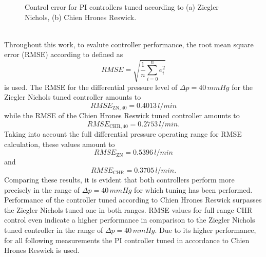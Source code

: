 \begin{figure}[ht]
  \centering
  \caption[Control error for PI Controllers]{Control error for PI controllers tuned according to (a) Ziegler Nichols, (b) Chien Hrones Reswick.}
  \label{fig:PI_error}
\end{figure}
\\Throughout this work, to evalute controller performance, the root mean square error (RMSE) according to \cite{RMSE} defined as
\begin{equation}
  RMSE = \sqrt{\frac{1}{n}\sum_{i=0}^n e_i^2}
\end{equation}
is used. The RMSE for the differential pressure level of $\Delta{p}=40\,mmHg$ for the Ziegler Nichols tuned controller amounts to
\begin{equation}
  RMSE_{\mathrm{ZN,40}}=0.4013\,l/min
\end{equation}
while the RMSE of the Chien Hrones Reswick tuned controller amounts to
\begin{equation}
  RMSE_{\mathrm{CHR,40}}=0.2753\,l/min.
\end{equation}
Taking into account the full differential pressure operating range for RMSE calculation, these values amount to
\begin{equation}
  RMSE_{\mathrm{ZN}}=0.5396\,l/min
\end{equation}
and
\begin{equation}
  RMSE_{\mathrm{CHR}}=0.3705\,l/min.
\end{equation}
Comparing these results, it is evident that both controllers perform more precisely in the range of $\Delta{p}=40\,mmHg$ for which tuning has been performed.
Performance of the controller tuned according to Chien Hrones Reswick surpasses the Ziegler Nichols tuned one in both ranges. RMSE values for full range CHR control even indicate a higher performance in comparison to the Ziegler Nichols tuned controller in the range of $\Delta{p}=40\,mmHg$.
Due to its higher performance, for all following measurements the PI controller tuned in accordance to Chien Hrones Reswick is used.
